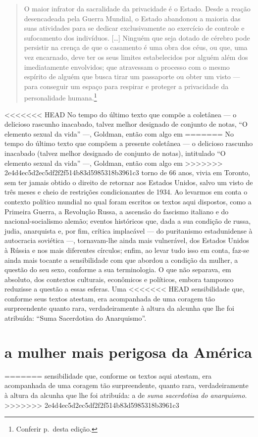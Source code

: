 \begin{quote}
O maior infrator da sacralidade da privacidade é o Estado. Desde a
reação desencadeada pela Guerra Mundial, o Estado abandonou a maioria
das suas atividades para se dedicar exclusivamente ao exercício de
controle e sufocamento dos indivíduos. {[}\ldots{]} Ninguém que seja dotado
de cérebro pode persistir na crença de que o casamento é uma obra dos
céus, ou que, uma vez encarnado, deve ter os seus limites estabelecidos
por alguém além dos imediatamente envolvidos; que atravessam o processo
com o mesmo espírito de alguém que busca tirar um passaporte ou obter um
visto --- para conseguir um espaço para respirar e proteger a privacidade
da personalidade humana.\footnote{Conferir p.\,\pageref{ref3} desta edição.}
\end{quote}

<<<<<<< HEAD
No tempo do último texto que compõe a coletânea --- o delicioso
rascunho inacabado, talvez melhor designado de conjunto de notas,
``O elemento sexual da vida'' ---, Goldman, então com algo em
=======
No tempo do último texto que compõem a presente coletânea --- o delicioso
rascunho inacabado (talvez melhor designado de conjunto de notas),
intitulado ``O elemento sexual da vida'' ---, Goldman, então com algo em
>>>>>>> 2e4d4ec5d2ec5df2f2f514b83d5985318b3961c3
torno de 66 anos, vivia em Toronto, sem ter jamais obtido o
direito de retornar aos Estados Unidos, salvo um visto de três meses e
cheio de restrições condicionantes de 1934. Ao levarmos em conta o
contexto político mundial no qual foram escritos os textos aqui dispostos,
como a Primeira Guerra, a Revolução Russa, a ascensão do fascismo
italiano e do nacional-socialismo alemão; eventos históricos
que, dada a sua condição de russa, judia, anarquista e, por
fim, crítica implacável --- do puritanismo estadunidense à autocracia
soviética ---, tornavam-lhe ainda mais vulnerável, dos Estados Unidos
à Rússia e nos mais diferentes círculos; enfim, ao levar tudo isso em
conta, faz-se ainda mais tocante a sensibilidade com que abordou a
condição da mulher, a questão do seu sexo, conforme a sua terminologia.
O que não separava, em absoluto, dos contextos culturais, econômicos e
políticos, embora tampouco reduzisse a questão a essas esferas. Uma
<<<<<<< HEAD
sensibilidade que, conforme seus textos atestam, era acompanhada de
uma coragem tão surpreendente quanto rara, verdadeiramente à altura da
alcunha que lhe foi atribuída: ``Suma Sacerdotisa do Anarquismo''.

\section{a mulher mais perigosa da América}
=======
sensibilidade que, conforme os textos aqui atestam, era acompanhada de
uma coragem tão surpreendente, quanto rara, verdadeiramente à altura da
alcunha que lhe foi atribuída: a de \textit{suma sacerdotisa do anarquismo}.
>>>>>>> 2e4d4ec5d2ec5df2f2f514b83d5985318b3961c3

